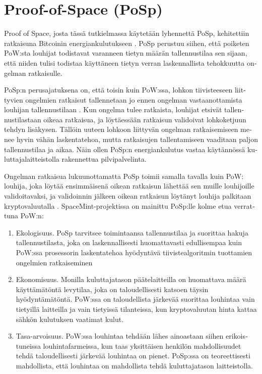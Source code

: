 \section{Proof-of-Space (PoSp)\label{posp}}
\begin{otherlanguage}{english}
Proof of Space, josta tässä tutkielmassa käytetään lyhennettä PoSp, kehitettiin ratkaisuna Bitcoinin energiankulutukseen \cite{pospchia1,posp2}. PoSp perustuu siihen, että poiketen PoW:sta louhijat todistavat varanneen tietyn määrän tallennustilaa sen sijaan, että niiden tulisi todistaa käyttäneen tietyn verran laskennallista tehokkuutta ongelman ratkaisulle.

PoSp:n perusajatuksena on, että toisin kuin PoW:ssa, lohkon tiivisteeseen liittyvien ongelmien ratkaisut tallennetaan jo ennen ongelman vastaanottamista louhijan tallennustilaan \cite{posp3spacemint}. Kun ongelma tulee ratkaista, louhijat etsivät tallennustilastaan oikeaa ratkaisua, ja löytäessään ratkaisun validoivat lohkoketjuun tehdyn lisäkysen. Tällöin uuteen lohkoon liittyvän ongelman ratkaisemiseen menee hyvin vähän laskentatehoa, mutta ratkaisujen tallentamiseen vaaditaan paljon tallennustilaa ja aikaa. Näin ollen PoSp:n energiankulutus vastaa käytännössä kuluttajalaitteistolla rakennettua pilvipalvelinta.

Ongelman ratkaisua lukuunottamatta PoSp toimii samalla tavalla kuin PoW: louhija, joka löytää ensimmäisenä oikean ratkaisun lähettää sen muille louhijoille validoitavaksi, ja validoinnin jälkeen oikean ratkaisun löytänyt louhija palkitaan kryptovaluutalla \cite{posp3spacemint}. SpaceMint-projektissa on mainittu PoSp:lle kolme etua verrattuna PoW:n:

\begin{enumerate}
\item Ekologisuus. PoSp tarvitsee toimintaansa tallennustilaa ja suorittaa hakuja tallennustilasta, joka on laskennallisesti huomattavasti edullisempaa kuin PoW:ssa prosessorin laskentatehoa hyödyntävä tiivistealgoritmin tuottamien ongelmien ratkaiseminen
\item Ekonomisuus. Monilla kuluttajatason päätelaitteilla on huomattava määrä käyttämätöntä levytilaa, joka on taloudellisesti katsoen täysin hyödyntämätöntä. PoW:ssa on taloudellista järkevää suorittaa louhintaa vain tietyillä laitteilla ja vain tietyissä tilanteissa, kun kryptovaluutan hinta kattaa sähkön kulutuksen vaatimat kulut.
\item Tasa-arvoisuus. PoW:ssa louhintaa tehdään lähes ainoastaan siihen erikoistuneissa louhintafarmeissa, kun taas yksittäisen henkilön mahdollisuudet tehdä taloudellisesti järkevää louhintaa on pienet. PoSp:ssa on teoreettisesti mahdollista, että louhintaa on mahdollista tehdä kuluttajatason laitteistolla.
\end{enumerate}


\end{otherlanguage}
